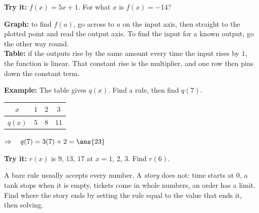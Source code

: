 \documentclass[12pt]{article}
\begin{document}
\begin{tryitbox}
\textbf{Try it:} \quad $f(x) = 5x + 1$. For what $x$ is $f(x) = -14$?\\[2pt]
\end{tryitbox}


\begin{formulabox}
\textbf{Graph:} to find $f(a)$, go across to $a$ on the input axis, then
straight to the plotted point and read the output axis. To find the input for a
known output, go the other way round.\\[3pt]
\textbf{Table:} if the outputs rise by the same amount every time the input
rises by $1$, the function is linear. That constant rise is the multiplier, and
one row then pins down the constant term.
\end{formulabox}

\begin{examplebox}
\textbf{Example:} \quad The table gives $q(x)$. Find a rule, then find $q(7)$.
\par\smallskip
\begin{center}
\begin{tabular}{|c|c|c|c|}\hline
$x$ & $1$ & $2$ & $3$ \\ \hline
$q(x)$ & $5$ & $8$ & $11$ \\ \hline
\end{tabular}
\end{center}

$\Rightarrow\quad q(7) = 3(7) + 2 = \ans{23}$
\end{examplebox}

\begin{tryitbox}
\textbf{Try it:} \quad $r(x)$ is $9$, $13$, $17$ at $x = 1$, $2$, $3$. Find
$r(6)$.\\[2pt]
\end{tryitbox}


\begin{formulabox}
A bare rule usually accepts every number. A \emph{story} does not: time starts
at $0$, a tank stops when it is empty, tickets come in whole numbers, an order
has a limit. Find where the story ends by setting the rule equal to the value
that ends it, then solving.
\end{formulabox}
\end{document}

